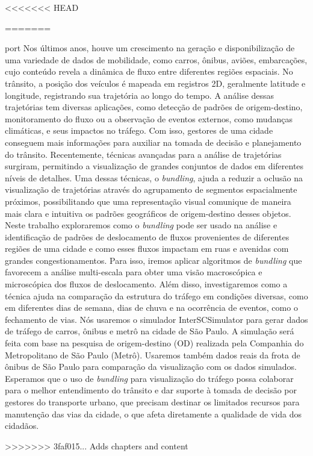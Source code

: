 <<<<<<< HEAD

=======
\begin{resumo}{port}
  Nos últimos anos, houve um crescimento na geração e disponibilização de uma
variedade de dados de mobilidade, como carros, ônibus, aviões, embarcações,
cujo conteúdo revela a dinâmica de fluxo entre diferentes regiões espaciais. No
trânsito, a posição dos veículos é mapeada em registros 2D, geralmente latitude
e longitude, registrando sua trajetória ao longo do tempo. A análise dessas
trajetórias tem diversas aplicações, como detecção de padrões de
origem-destino, monitoramento do fluxo ou a observação de eventos externos,
como mudanças climáticas, e seus impactos no tráfego. Com isso, gestores de uma
cidade conseguem mais informações para auxiliar na tomada de decisão e
planejamento do trânsito. Recentemente, técnicas avançadas para a análise de
trajetórias surgiram, permitindo a visualização de grandes conjuntos de dados
em diferentes níveis de detalhes. Uma dessas técnicas, o \emph{bundling},  ajuda a
reduzir a oclusão na visualização de trajetórias através do agrupamento de
segmentos espacialmente próximos, possibilitando que uma representação visual
comunique de maneira mais clara e intuitiva os padrões geográficos de
origem-destino desses objetos. Neste trabalho exploraremos como o \emph{bundling} pode
ser usado na análise e identificação de padrões de deslocamento de fluxos
provenientes de diferentes regiões de uma cidade e como esses fluxos impactam
em ruas e avenidas com grandes congestionamentos. Para isso, iremos aplicar
algoritmos de \emph{bundling} que favorecem a análise multi-escala para obter uma
visão macroscópica e microscópica dos fluxos de deslocamento. Além disso,
investigaremos como a técnica ajuda na comparação da estrutura do tráfego em
condições diversas, como em diferentes dias de semana, dias de chuva e na
ocorrência de eventos, como o fechamento de vias. Nós usaremos o simulador
InterSCSimulator para gerar dados de tráfego de carros, ônibus e metrô na
cidade de São Paulo. A simulação será feita com base na pesquisa de
origem-destino (OD) realizada pela Companhia do Metropolitano de São Paulo
(Metrô). Usaremos também dados reais da frota de ônibus de São Paulo para
comparação da visualização com os dados simulados. Esperamos que o uso de
\emph{bundling} para visualização do tráfego possa colaborar  para o melhor
entendimento do trânsito e dar suporte à tomada de decisão por gestores do
transporte urbano, que precisam destinar os limitados recursos para manutenção
das vias da cidade, o que afeta diretamente a qualidade de vida dos cidadãos.
\end{resumo}
>>>>>>> 3faf015... Adds chapters and content

